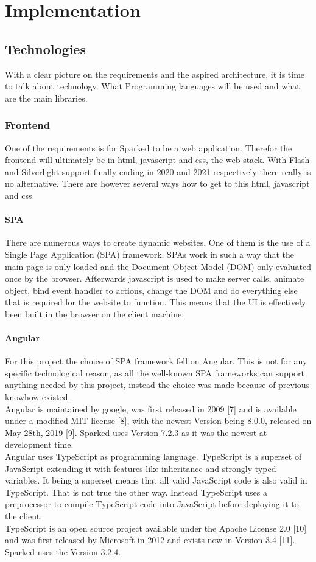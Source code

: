\chapter{Implementation}
\section{Technologies}
With a clear picture on the requirements and the aspired architecture, it is time to talk about technology. What Programming languages will be used and what are the main libraries.
\subsection{Frontend}
One of the requirements is for Sparked to be a web application. Therefor the frontend will ultimately be in html, javascript and css, the web stack. With Flash and Silverlight support finally ending in 2020 and 2021 respectively  \cite{silverlight} \cite{flash}  there really is no alternative. There are however several ways how to get to this html, javascript and css.
\subsubsection{SPA}
There are numerous ways to create dynamic websites. One of them is the use of a Single Page Application (SPA) framework. SPAs work in such a way that the main page is only loaded and the Document Object Model (DOM) only evaluated once by the browser. Afterwards javascript is used to make server calls, animate object, bind event handler to actions, change the DOM and do everything else that is required for the website to function. This means that the UI is effectively been built in the browser on the client machine.
\subsubsection{Angular}
For this project the choice of SPA framework fell on Angular. This is not for any specific technological reason, as all the well-known SPA frameworks can support anything needed by this project, instead the choice was made because of previous knowhow existed. \\
Angular is maintained by google, was first released in 2009 [7] and is available under a modified MIT license [8], with the newest Version being 8.0.0, released on May 28th, 2019 [9]. Sparked uses Version 7.2.3 as it was the newest at development time. \\
Angular uses TypeScript as programming language. TypeScript is a superset of JavaScript extending it with features like inheritance and strongly typed variables. It being a superset means that all valid JavaScript code is also valid in TypeScript. That is not true the other way. Instead TypeScript uses a preprocessor to compile TypeScript code into JavaScript before deploying it to the client. \\
TypeScript is an open source project available under the Apache License 2.0 [10] and was first released by Microsoft in 2012 and exists now in Version 3.4 [11]. Sparked uses the Version 3.2.4. 
